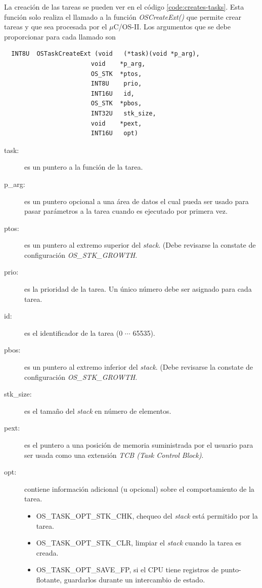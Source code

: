 \documentclass[11pt,a4paper,oneside]{article}
\def\uCOS{$\mu$C/OS-II\texttrademark}
\begin{document}
La creación de las tareas se pueden ver en el código \ref{code:creates-tasks}. Esta función solo realiza el llamado a la función \emph{OSCreateExt()} que permite crear tareas y que sea procesada por el \uCOS. Los argumentos que se debe proporcionar para cada llamado son 

\begin{lstlisting}
  INT8U  OSTaskCreateExt (void   (*task)(void *p_arg),
                        void    *p_arg,
                        OS_STK  *ptos,
                        INT8U    prio,
                        INT16U   id,
                        OS_STK  *pbos,
                        INT32U   stk_size,
                        void    *pext,
                        INT16U   opt)
\end{lstlisting}

\begin{description}
\item[task:] es un puntero a la función de la tarea.
\item[p\_arg:] es un puntero opcional a una área de datos el cual pueda ser usado para pasar parámetros a la tarea cuando es ejecutado por primera vez.
\item[ptos:] es un puntero al extremo superior del \textsl{stack}. (Debe revisarse la constate de configuración \emph{OS\_STK\_GROWTH}.
\item[prio:] es la prioridad de la tarea. Un único número debe ser asignado para cada tarea.
\item[id:] es el identificador de la tarea (0 $\cdots$ 65535).
\item[pbos:] es un puntero al extremo inferior del \textsl{stack}. (Debe revisarse la constate de configuración \emph{OS\_STK\_GROWTH}.
\item[stk\_size:] es el tamaño del \textsl{stack} en número de elementos.
\item[pext:] es el puntero a una posición de memoria suministrada por el usuario para ser usada como una extensión \emph{TCB (Task Control Block)}.
\item[opt:] contiene información adicional (u opcional) sobre el comportamiento de la tarea. 
  \begin{itemize}
  \item OS\_TASK\_OPT\_STK\_CHK, chequeo del \textsl{stack} está permitido por la tarea.
  \item OS\_TASK\_OPT\_STK\_CLR, limpiar el \textsl{stack} cuando la tarea es creada.
  \item OS\_TASK\_OPT\_SAVE\_FP, si el CPU tiene registros de punto-flotante, guardarlos durante un intercambio de estado.
  \end{itemize}
\end{description}
\end{document}
